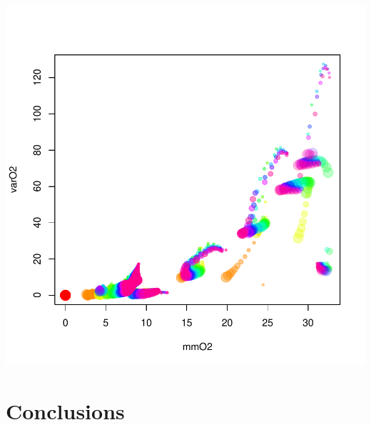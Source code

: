 \documentclass[a0,landscape]{a0poster}
\begin{document}
\begin{multicols}{4}
\begin{block}{}
\end{block}

\begin{block}
\includegraphics{conference_poster_5-sens}

\end{block}


\color{SaddleBrown} %

\section*{Conclusions}


\end{multicols}
\end{document}
